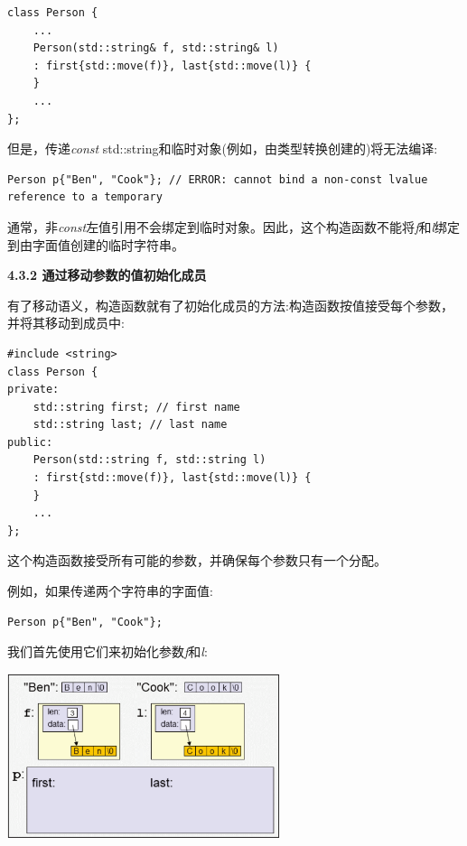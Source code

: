 \begin{lstlisting}[caption={}]
class Person {
	...
	Person(std::string& f, std::string& l)
	: first{std::move(f)}, last{std::move(l)} {
	}
	...
};
\end{lstlisting}

但是，传递\textit{const} std::string和临时对象(例如，由类型转换创建的)将无法编译:\par

\begin{lstlisting}[caption={}]
Person p{"Ben", "Cook"}; // ERROR: cannot bind a non-const lvalue reference to a temporary
\end{lstlisting}

通常，非\textit{const}左值引用不会绑定到临时对象。因此，这个构造函数不能将\textit{f}和\textit{l}绑定到由字面值创建的临时字符串。\par

\hspace*{\fill} \par %
\textbf{4.3.2 通过移动参数的值初始化成员}

有了移动语义，构造函数就有了初始化成员的方法:构造函数按值接受每个参数，并将其移动到成员中:\par

{\color{red}{basics/initmove.hpp}}

\begin{lstlisting}[caption={}]
#include <string>
class Person {
private:
	std::string first; // first name
	std::string last; // last name
public:
	Person(std::string f, std::string l)
	: first{std::move(f)}, last{std::move(l)} {
	}
	...
};
\end{lstlisting}

这个构造函数接受所有可能的参数，并确保每个参数只有一个分配。\par

例如，如果传递两个字符串的字面值:\par

\begin{lstlisting}[caption={}]
Person p{"Ben", "Cook"};
\end{lstlisting}

我们首先使用它们来初始化参数\textit{f}和\textit{l}:\par

\begin{center}
	\includegraphics[width=0.6\textwidth]{content/1/chapter4/images/4}
\end{center}

